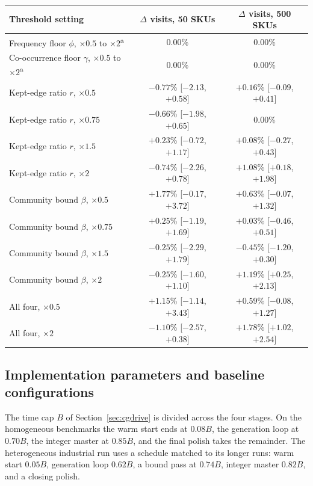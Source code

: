\documentclass[]{interact}
\begin{document}
\begin{table}[H]
\centering
{}
{\small\setlength{\tabcolsep}{4pt}\begin{tabularx}{\textwidth}{@{}X c c@{}}
\toprule
Threshold setting & $\Delta$ visits, 50 SKUs & $\Delta$ visits, 500 SKUs \\
\midrule
Frequency floor $\phi$, $\times0.5$ to $\times2$\textsuperscript{a}     & $0.00$\% & $0.00$\% \\
Co-occurrence floor $\gamma$, $\times0.5$ to $\times2$\textsuperscript{a} & $0.00$\% & $0.00$\% \\
\midrule
Kept-edge ratio $r$, $\times0.5$   & $-0.77$\% [$-2.13$, $+0.58$] & $+0.16$\% [$-0.09$, $+0.41$] \\
Kept-edge ratio $r$, $\times0.75$  & $-0.66$\% [$-1.98$, $+0.65$] & $0.00$\% \\
Kept-edge ratio $r$, $\times1.5$   & $+0.23$\% [$-0.72$, $+1.17$] & $+0.08$\% [$-0.27$, $+0.43$] \\
Kept-edge ratio $r$, $\times2$     & $-0.74$\% [$-2.26$, $+0.78$] & $+1.08$\% [$+0.18$, $+1.98$] \\
\midrule
Community bound $\beta$, $\times0.5$  & $+1.77$\% [$-0.17$, $+3.72$] & $+0.63$\% [$-0.07$, $+1.32$] \\
Community bound $\beta$, $\times0.75$ & $+0.25$\% [$-1.19$, $+1.69$] & $+0.03$\% [$-0.46$, $+0.51$] \\
Community bound $\beta$, $\times1.5$  & $-0.25$\% [$-2.29$, $+1.79$] & $-0.45$\% [$-1.20$, $+0.30$] \\
Community bound $\beta$, $\times2$    & $-0.25$\% [$-1.60$, $+1.10$] & $+1.19$\% [$+0.25$, $+2.13$] \\
\midrule
All four, $\times0.5$ & $+1.15$\% [$-1.14$, $+3.43$] & $+0.59$\% [$-0.08$, $+1.27$] \\
All four, $\times2$   & $-1.10$\% [$-2.57$, $+0.38$] & $+1.78$\% [$+1.02$, $+2.54$] \\
\bottomrule
\end{tabularx}}
\label{tab:sensitivity}
\end{table}

\subsection{Implementation parameters and baseline configurations}\label{app:baselines}
The time cap $B$ of Section~\ref{sec:cgdrive} is divided across the four stages. On the homogeneous benchmarks the warm start ends at $0.08B$, the generation loop at $0.70B$, the integer master at $0.85B$, and the final polish takes the remainder. The heterogeneous industrial run uses a schedule matched to its longer runs: warm start $0.05B$, generation loop $0.62B$, a bound pass at $0.74B$, integer master $0.82B$, and a closing polish.
\end{document}
